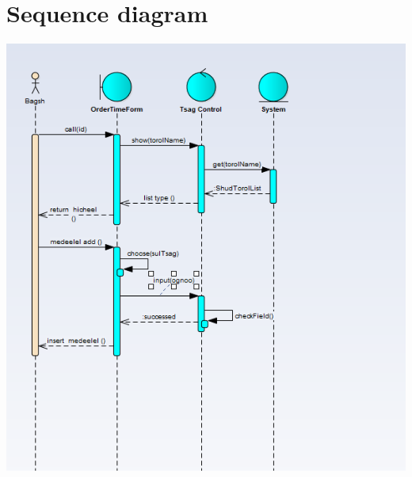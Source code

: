 \documentclass[12pd]{article}
\begin{document}
	\section{Sequence  diagram}
	\includegraphics[width=\textwidth]{sequence}
	
	
	
	
	
	
\end{document}
